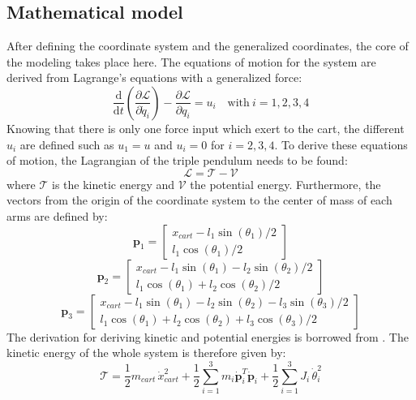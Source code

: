 \documentclass[a4paper,12pt]{article}
\begin{document}
\subsection{Mathematical model} \label{sec:mathmodel}
After defining the coordinate system and the generalized coordinates, the core of the modeling takes place here. The equations of motion for the system are derived from Lagrange's equations with a generalized force:
\begin{equation} \label{equ:Lagrange_motions}
	\frac{\text{d}}{\text{d}t} \left(\frac{\partial \mathcal{L}}{\partial \dot q_i}\right) - \frac{\partial \mathcal{L}}{\partial q_i} = u_i
	\quad \text{with}\ i=1,2,3,4
\end{equation}
Knowing that there is only one force input which exert to the cart, the different $u_i$ are defined such as $u_1 = u$ and $u_i = 0$ for $i=2,3,4$. To derive these equations of motion, the Lagrangian of the triple pendulum needs to be found:
\begin{equation}
	\mathcal{L} = \mathcal{T} - \mathcal{V}
\end{equation}
where $\mathcal{T}$ is the kinetic energy and $\mathcal{V}$ the potential energy. Furthermore, the vectors from the origin of the coordinate system to the center of mass of each arms are defined by:
\[
	\mathbf{p}_1 =
	\begin{bmatrix}
		x_{cart} - l_1 \sin(\theta_1)/2 \\
		l_1 \cos(\theta_1)/2
	\end{bmatrix}
\]
\[
	\mathbf{p}_2 =
	\begin{bmatrix}
		x_{cart} - l_1 \sin(\theta_1) - l_2 \sin(\theta_2)/2 \\
		l_1 \cos(\theta_1) + l_2 \cos(\theta_2)/2
	\end{bmatrix}
\]
\[
	\mathbf{p}_3 =
	\begin{bmatrix}
		x_{cart} - l_1 \sin(\theta_1) - l_2 \sin(\theta_2) - l_3 \sin(\theta_3)/2 \\
		l_1 \cos(\theta_1) + l_2 \cos(\theta_2) + l_3 \cos(\theta_3)/2
	\end{bmatrix}
\]
The derivation for deriving kinetic and potential energies is borrowed from \citet{Gluck2013801}. The kinetic energy of the whole system is therefore given by:
\begin{equation} \label{equ:kinetic}
	\mathcal{T} = \frac{1}{2} m_{cart}\, \dot x_{cart}^2 +
		\frac{1}{2} \sum_{i=1}^{3} m_i \mathbf{\dot p}_i^T \mathbf{\dot p}_i +
		\frac{1}{2} \sum_{i=1}^{3} J_i\, \dot\theta_i^2
\end{equation}
\end{document}
